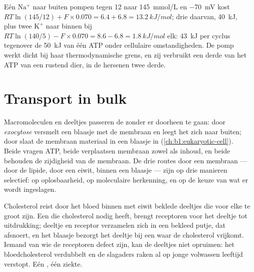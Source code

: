 \begin{example}\label{ex:b1:membranes-transport:pumpcost}
Eén $\mathrm{Na^+}$ naar buiten pompen tegen \qty{12}{} naar \qty{145}{mmol/L} en
\qty{-70}{mV} kost $RT\ln(145/12) + F\times 0.070 = 6.4 + 6.8 =
\qty{13.2}{kJ/mol}$; drie daarvan, \qty{40}{kJ}, plus twee $\mathrm{K^+}$ naar
binnen bij $RT\ln(140/5) - F\times 0.070 = 8.6 - 6.8 =
\qty{1.8}{kJ/mol}$ elk: \qty{43}{kJ} per cyclus tegenover de \qty{50}{kJ} van één
ATP onder cellulaire omstandigheden. De pomp werkt dicht bij haar thermodynamische
grens, en zij verbruikt een derde van het ATP van een rustend dier, in de hersenen
twee derde.
\end{example}

\section{Transport in bulk}

\begin{proposition}[Blaasjestransport]\label{prop:b1:membranes-transport:vesicles}
Macromoleculen en deeltjes passeren de  zonder er doorheen te gaan:
door \emph{exocytose} versmelt een blaasje met de membraan en leegt het zich naar
buiten; door \emph{} slaat de membraan materiaal in een blaasje in
(\cref{ch:b1:eukaryotic-cell}). Beide vragen ATP, beide verplaatsen membraan
zowel als inhoud, en beide behouden de zijdigheid van de membraan. De drie routes
door een membraan --- door de lipide, door een eiwit, binnen een blaasje --- zijn
op drie manieren selectief: op oplosbaarheid, op moleculaire herkenning, en op de
keuze van wat er wordt ingeslagen.
\end{proposition}

\begin{example}\label{ex:b1:membranes-transport:ldl}
Cholesterol reist door het bloed binnen met eiwit beklede deeltjes die voor elke
 te groot zijn. Een  die cholesterol nodig heeft, brengt receptoren voor
het deeltje tot uitdrukking; deeltje en receptor verzamelen zich in een bekleed
putje, dat afsnoert, en het blaasje bezorgt het deeltje bij een  waar de
cholesterol vrijkomt. Iemand van wie de receptoren defect zijn, kan de deeltjes
niet opruimen: het bloedcholesterol verdubbelt en de slagaders raken al op jonge
volwassen leeftijd verstopt. Eén , één ziekte.
\end{example}

